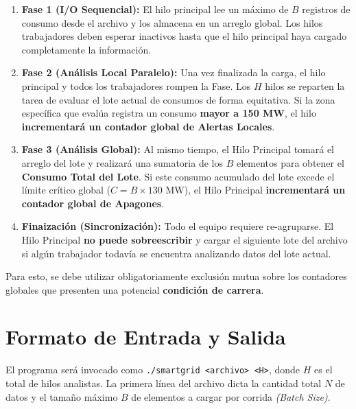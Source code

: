 \documentclass[12pt,a4paper]{article}
\begin{document}
\begin{enumerate}
    \item \textbf{Fase 1 (I/O Sequencial):} El hilo principal lee un máximo de $B$ registros de consumo desde el archivo y los almacena en un arreglo global. Los hilos trabajadores deben esperar inactivos hasta que el hilo principal haya cargado completamente la información.
    
    \item \textbf{Fase 2 (Análisis Local Paralelo):} Una vez finalizada la carga, el hilo principal y todos los trabajadores rompen la Fase. Los $H$ hilos se reparten la tarea de evaluar el lote actual de consumos de forma equitativa. 
    Si la zona específica que evalúa registra un consumo \textbf{mayor a 150 MW}, el hilo \textbf{incrementará un contador global de Alertas Locales}.
    
    \item \textbf{Fase 3 (Análisis Global):} Al mismo tiempo, el Hilo Principal tomará el arreglo del lote y realizará una sumatoria de los $B$ elementos para obtener el \textbf{Consumo Total del Lote}. Si este consumo acumulado del lote excede el límite crítico global ($C = B \times 130$ MW), el Hilo Principal \textbf{incrementará un contador global de Apagones}.
    
    \item \textbf{Finaización (Sincronización):} Todo el equipo requiere re-agruparse. El Hilo Principal \textbf{no puede sobreescribir} y cargar el siguiente lote del archivo si algún trabajador todavía se encuentra analizando datos del lote actual.
\end{enumerate}

Para esto, se debe utilizar obligatoriamente exclusión mutua sobre los contadores globales que presenten una potencial \textbf{condición de carrera}.

\newpage

\section*{Formato de Entrada y Salida}
El programa será invocado como \texttt{./smartgrid <archivo> <H>}, donde $H$ es el total de hilos analistas. 
La primera línea del archivo dicta la cantidad total $N$ de datos y el tamaño máximo $B$ de elementos a cargar por corrida \textit{(Batch Size)}.
\end{document}
